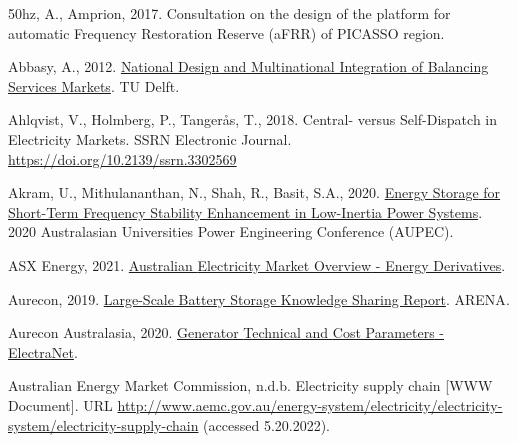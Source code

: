 \documentclass[12pt,a4paper,]{report}
\newlength{\cslhangindent}
\newenvironment{CSLReferences}[2] %
 {%
  \setlength{\parindent}{0pt}
  \ifodd #1 \everypar{\setlength{\hangindent}{\cslhangindent}}\ignorespaces\fi
  \ifnum #2 > 0
  \setlength{\parskip}{#2\baselineskip}
  \fi
 }%
 {}
\begin{document}
\hypertarget{refs}{}
\begin{CSLReferences}{1}{0}
\leavevmode{}%
50hz, A., Amprion, 2017. Consultation on the design of the platform for
automatic {Frequency Restoration Reserve} ({aFRR}) of {PICASSO} region.

\leavevmode{}%
Abbasy, A., 2012.
\href{https://doi.org/10.4233/uuid:71f7138f-3af2-4bc3-b035-a3e42b3cafaf}{National
{Design} and {Multinational Integration} of {Balancing Services
Markets}}. {TU Delft}.

\leavevmode{}%
Ahlqvist, V., Holmberg, P., Tangerås, T., 2018. Central- versus
{Self-Dispatch} in {Electricity Markets}. SSRN Electronic Journal.
\url{https://doi.org/10.2139/ssrn.3302569}

\leavevmode{}%
Akram, U., Mithulananthan, N., Shah, R., Basit, S.A., 2020.
\href{https://www.semanticscholar.org/paper/Energy-Storage-for-Short-Term-Frequency-Stability-Akram-Mithulananthan/b74131f080c15125436fe65784135492fa318b02}{Energy
{Storage} for {Short-Term Frequency Stability Enhancement} in
{Low-Inertia Power Systems}}. 2020 Australasian Universities Power
Engineering Conference (AUPEC).

\leavevmode{}%
ASX Energy, 2021.
\href{https://www.asxenergy.com.au/products/electricity_futures}{Australian
{Electricity Market Overview} - {Energy Derivatives}}.

\leavevmode{}%
Aurecon, 2019.
\href{https://arena.gov.au/knowledge-bank/large-scale-battery-storage-knowledge-sharing-report/}{Large-{Scale
Battery Storage Knowledge Sharing Report}}. {ARENA}.

\leavevmode{}%
Aurecon Australasia, 2020.
\href{https://www.electranet.com.au/wp-content/uploads/projects/2016/11/508986-REP-ElectraNet-Generator-Technical-And-Cost-Parameters-23July2020.pdf}{Generator
{Technical} and {Cost Parameters} - {ElectraNet}}.

\leavevmode{}%
Australian Energy Market Commission, n.d.b. Electricity supply chain
{[}WWW Document{]}. URL
\url{http://www.aemc.gov.au/energy-system/electricity/electricity-system/electricity-supply-chain}
(accessed 5.20.2022).


\end{CSLReferences}
\end{document}
